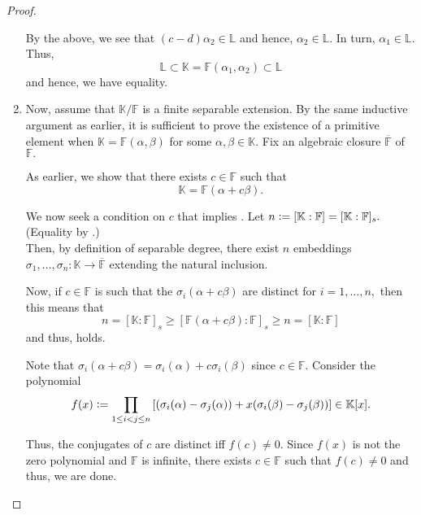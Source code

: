 \begin{proof}
\begin{enumerate}
        By the above, we see that $(c - d)\alpha_2 \in \mathbb{L}$ and hence, $\alpha_2 \in \mathbb{L}.$ In turn, $\alpha_1 \in \mathbb{L}.$ Thus,
        \begin{equation*} 
            \mathbb{L} \subset \mathbb{K} = \mathbb{F}(\alpha_1, \alpha_2) \subset \mathbb{L}
        \end{equation*}
        and hence, we have equality.
        \item Now, assume that $\mathbb{K}/\mathbb{F}$ is a finite separable extension. By the same inductive argument as earlier, it is sufficient to prove the existence of a primitive element when $\mathbb{K} = \mathbb{F}(\alpha, \beta)$ for some $\alpha, \beta \in \mathbb{K}.$ Fix an algebraic closure $\overline{\mathbb{F}}$ of $\mathbb{F}.$

        As earlier, we show that there exists $c \in \mathbb{F}$ such that
        \begin{equation} \label{eq:003} \tag{$*$}
            \mathbb{K} = \mathbb{F}(\alpha + c\beta).
        \end{equation}

        We now seek a condition on $c$ that implies . Let $n \vcentcolon= [\mathbb{K} : \mathbb{F}] = [\mathbb{K} : \mathbb{F}]_s.$ (Equality by .) \\
        Then, by definition of separable degree, there exist $n$ embeddings $\sigma_1, \ldots, \sigma_n : \mathbb{K} \to \overline{\mathbb{F}}$ extending the natural inclusion. 

        Now, if $c \in \mathbb{F}$ is such that the  $\sigma_i(\alpha + c\beta)$ are distinct for $i = 1, \ldots, n,$ then this means that 
        \begin{equation*} 
            n = [\mathbb{K} : \mathbb{F}]_s \ge [\mathbb{F}(\alpha + c\beta) : \mathbb{F}]_s \ge n = [\mathbb{K} : \mathbb{F}]
        \end{equation*}
        and thus,  holds.

        Note that $\sigma_i(\alpha + c\beta) = \sigma_i(\alpha) + c\sigma_i(\beta)$ since $c \in \mathbb{F}.$ Consider the polynomial
        \begin{equation*} 
            f(x) \vcentcolon= \prod_{1 \le i < j \le n}\left[(\sigma_i(\alpha) - \sigma_j(\alpha)) + x(\sigma_i(\beta) - \sigma_j(\beta))\right] \in \mathbb{K}[x].
        \end{equation*}

        Thus, the conjugates of $c$ are distinct iff $f(c) \neq 0.$ Since $f(x)$ is not the zero polynomial and $\mathbb{F}$ is infinite, there exists $c \in \mathbb{F}$ such that $f(c) \neq 0$ and thus, we are done.
    \end{enumerate}
\end{proof}


